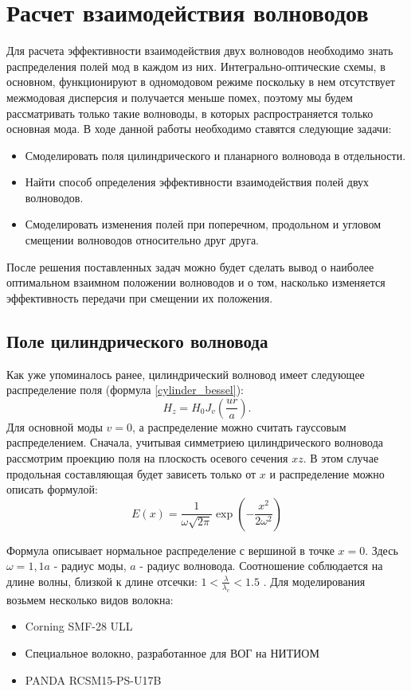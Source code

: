 \chapter{Расчет взаимодействия волноводов}
\label{coupling}

Для расчета эффективности взаимодействия двух волноводов необходимо знать распределения полей мод в каждом из них. Интегрально-оптические схемы, в основном, функционируют в одномодовом режиме поскольку в нем отсутствует межмодовая дисперсия и получается меньше помех, поэтому мы будем рассматривать только такие волноводы, в которых распространяется только основная мода. В ходе данной работы необходимо ставятся следующие задачи:
\begin{itemize}
	\item Смоделировать поля цилиндрического и планарного волновода в отдельности.
	\item Найти способ определения эффективности взаимодействия полей двух волноводов.
	\item Смоделировать изменения полей при поперечном, продольном и угловом смещении волноводов относительно друг друга.
\end{itemize} 
После решения поставленных задач можно будет сделать вывод о наиболее оптимальном взаимном положении волноводов и о том, насколько изменяется эффективность передачи при смещении их положения.

\section{Поле цилиндрического волновода}
\label{cylinder_field}
Как уже упоминалось ранее, цилиндрический волновод имеет следующее распределение поля (формула \ref{cylinder_bessel}):
$$
	H_z = H_0 J_v (\frac{ur}{a}).
$$
Для основной моды $v = 0$, а распределение можно считать гауссовым распределением. Сначала, учитывая  симметриею цилиндрического волновода рассмотрим проекцию поля на плоскость осевого сечения $xz$. В этом случае продольная составляющая будет зависеть только от $x$ и распределение можно описать формулой:
\begin{equation}
  \label{gauss}
  E(x)=\frac{1}{\omega\sqrt{2\pi}}\exp\left(-\frac{x^2}{2\omega^2}\right)
\end{equation}

Формула описывает нормальное распределение с вершиной в точке $x=0$.
Здесь $\omega = 1{,}1a$ - радиус моды, $a$ - радиус волновода. Соотношение соблюдается на длине волны, близкой к длине отсечки: $1 < \frac{\lambda}{\lambda_c} < 1.5$ \cite{lefevre}. Для моделирования возьмем несколько видов волокна:
\begin{itemize}
\item Corning SMF-28 ULL
\item Специальное волокно, разработанное для ВОГ на НИТИОМ
\item PANDA RCSM15-PS-U17B
\end{itemize}

